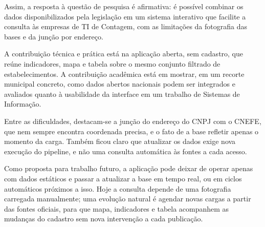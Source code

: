 \documentclass[a4paper,12pt]{article}
\begin{document}
Assim, a resposta à questão de pesquisa é afirmativa: é possível combinar os dados disponibilizados pela legislação em um sistema interativo que facilite a consulta às empresas de TI de Contagem, com as limitações da fotografia das bases e da junção por endereço.

A contribuição técnica e prática está na aplicação aberta, sem cadastro, que reúne indicadores, mapa e tabela sobre o mesmo conjunto filtrado de estabelecimentos.
A contribuição acadêmica está em mostrar, em um recorte municipal concreto, como dados abertos nacionais podem ser integrados e avaliados quanto à usabilidade da interface em um trabalho de Sistemas de Informação.

Entre as dificuldades, destacam-se a junção do endereço do CNPJ com o CNEFE, que nem sempre encontra coordenada precisa, e o fato de a base refletir apenas o momento da carga.
Também ficou claro que atualizar os dados exige nova execução do pipeline, e não uma consulta automática às fontes a cada acesso.

Como proposta para trabalho futuro, a aplicação pode deixar de operar apenas com dados estáticos e passar a atualizar a base em tempo real, ou em ciclos automáticos próximos a isso.
Hoje a consulta depende de uma fotografia carregada manualmente; uma evolução natural é agendar novas cargas a partir das fontes oficiais, para que mapa, indicadores e tabela acompanhem as mudanças do cadastro sem nova intervenção a cada publicação.



 \newpage
{}



\newpage
\singlespace

\end{document}
